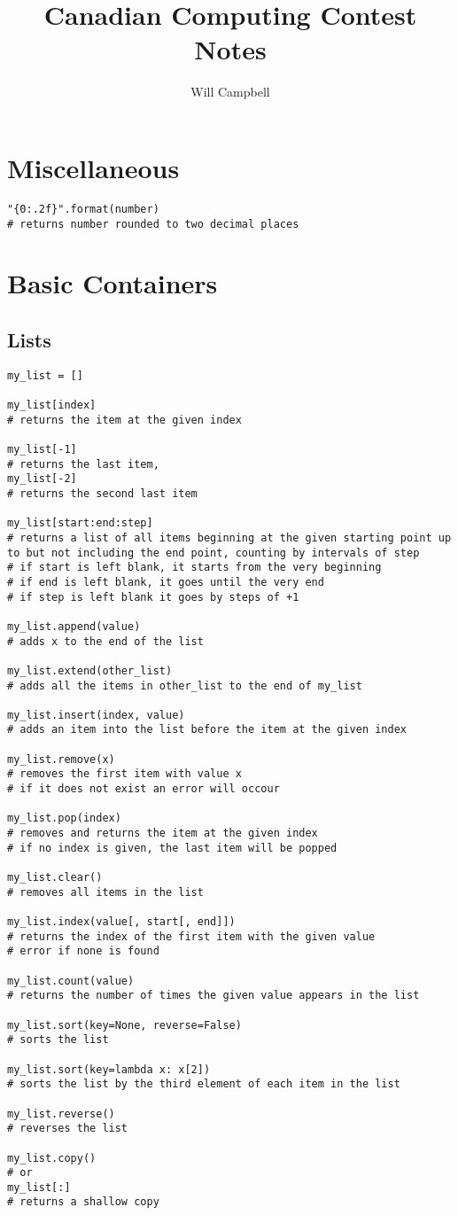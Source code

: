 \documentclass[12pt]{article}
\title{Canadian Computing Contest Notes}
\author{Will Campbell}
\begin{document}
\section{Miscellaneous}
\begin{lstlisting}
"{0:.2f}".format(number)
# returns number rounded to two decimal places
\end{lstlisting}

\section{Basic Containers}
\subsection{Lists}
\begin{lstlisting}
my_list = []

my_list[index]
# returns the item at the given index

my_list[-1]
# returns the last item,
my_list[-2]
# returns the second last item

my_list[start:end:step]
# returns a list of all items beginning at the given starting point up to but not including the end point, counting by intervals of step
# if start is left blank, it starts from the very beginning
# if end is left blank, it goes until the very end
# if step is left blank it goes by steps of +1

my_list.append(value)
# adds x to the end of the list

my_list.extend(other_list)
# adds all the items in other_list to the end of my_list

my_list.insert(index, value)
# adds an item into the list before the item at the given index

my_list.remove(x)
# removes the first item with value x
# if it does not exist an error will occour

my_list.pop(index)
# removes and returns the item at the given index
# if no index is given, the last item will be popped

my_list.clear()
# removes all items in the list

my_list.index(value[, start[, end]])
# returns the index of the first item with the given value
# error if none is found

my_list.count(value)
# returns the number of times the given value appears in the list

my_list.sort(key=None, reverse=False)
# sorts the list

my_list.sort(key=lambda x: x[2])
# sorts the list by the third element of each item in the list

my_list.reverse()
# reverses the list

my_list.copy()
# or
my_list[:]
# returns a shallow copy
\end{lstlisting}
\end{document}
